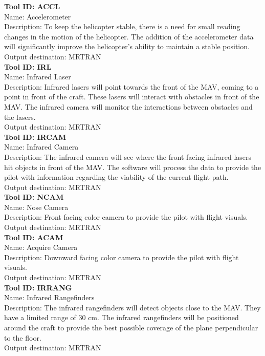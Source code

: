 \documentclass[onecolumn, oneside, letterpaper, draftclsnofoot, 10pt, compsoc]{IEEEtran}
\begin{document}
\noindent
\textbf{Tool ID: ACCL}\\
Name: Accelerometer\\
Description: To keep the helicopter stable, there is a need for small reading changes in the motion of the helicopter. The addition of the accelerometer data will significantly improve the helicopter’s ability to maintain a stable position.\\
Output destination: MRTRAN\\

\noindent
\textbf{Tool ID: IRL}\\
Name: Infrared Laser\\
Description: Infrared lasers will point towards the front of the MAV, coming to a point in front of the craft. These lasers will interact with obstacles in front of the MAV.  The infrared camera will monitor the interactions between obstacles and the lasers.\\
Output destination: MRTRAN\\

\noindent
\textbf{Tool ID: IRCAM}\\
Name: Infrared Camera\\
Description: The infrared camera will see where the front facing infrared lasers hit objects in front of the MAV. The software will process the data to provide the pilot with information regarding the viability of the current flight path.\\
Output destination: MRTRAN\\

\noindent
\textbf{Tool ID: NCAM}\\
Name: Nose Camera\\
Description: Front facing color camera to provide the pilot with flight visuals.\\
Output destination: MRTRAN\\

\noindent
\textbf{Tool ID: ACAM}\\
Name: Acquire Camera\\
Description: Downward facing color camera to provide the pilot with flight visuals.\\
Output destination: MRTRAN\\

\noindent
\textbf{Tool ID: IRRANG}\\
Name: Infrared Rangefinders\\
Description: The infrared rangefinders will detect objects close to the MAV. They have a limited range of 30 cm. The infrared rangefinders will be positioned around the craft to provide the best possible coverage of the plane perpendicular to the floor.\\
Output destination: MRTRAN\\
\end{document}

